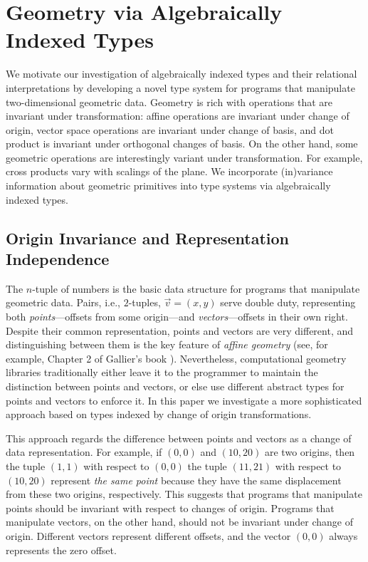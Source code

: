 \section{Geometry via Algebraically Indexed Types}
\label{sec:motivating-examples}

We motivate our investigation of algebraically indexed types and their
relational interpretations by developing a novel type system for
programs that manipulate two-dimensional geometric data. Geometry is
rich with operations that are invariant under transformation: affine
operations are invariant under change of origin, vector space
operations are invariant under change of basis, and dot product is
invariant under orthogonal changes of basis. On the other hand, some
geometric operations are interestingly variant under transformation.
For example, cross products vary with scalings of the plane. We
incorporate (in)variance information about geometric primitives
into type systems via algebraically indexed types.

\subsection{Origin Invariance and Representation Independence}\label{sec:oiri}

The $n$-tuple of numbers is the basic data structure for programs that
manipulate geometric data. Pairs, i.e., $2$-tuples, 
$\vec{v} = (x,y)$ serve double duty, representing
both \emph{points}---offsets from some origin---and
\emph{vectors}---offsets in their own right.  Despite their common
representation, points and vectors are very different, and
distinguishing between them is the key feature of \emph{affine
  geometry} (see, for example, Chapter 2 of Gallier's book
\cite{gallier11geometric}). Nevertheless, computational geometry
libraries traditionally either leave it to the programmer to maintain
the distinction between points and vectors, or else use different
abstract types for points and vectors to enforce it.
In this paper we investigate a more sophisticated approach based on 
types indexed by change of origin transformations.

This approach regards the difference between points and vectors as a
change of data representation. For example, if $(0,0)$ and $(10,20)$
are two origins, then the tuple $(1,1)$ with respect to $(0,0)$ the
tuple $(11,21)$ with respect to $(10,20)$ represent \emph{the same
  point} because they have the same displacement from these two
origins, respectively.
This suggests that programs that manipulate points %
should be invariant with respect to changes of
origin. Programs that manipulate vectors, on the other hand, should
not be invariant under change of origin. Different vectors represent
different offsets, and the vector $(0,0)$ always represents the zero
offset.

